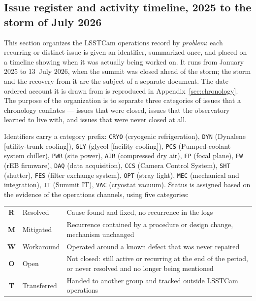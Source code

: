 \subsection{Issue register and activity timeline, 2025 to the storm of July 2026}
\label{sec:issues}

This section organizes the LSSTCam operations record by
\emph{problem}: each recurring or distinct issue is given an identifier,
summarized once, and placed on a timeline showing when it was actually being
worked on.  It runs from January 2025 to 13~July 2026, when the summit was
closed ahead of the storm; the storm and the recovery from it are the subject
of a separate document.  The date-ordered account it is drawn from is
reproduced in Appendix~\ref{sec:chronology}.  The purpose of the organization is to
separate three categories of issues that a chronology conflates --- issues that were closed,
issues that the observatory learned to live with, and issues that were never
closed at all.

Identifiers carry a category prefix: \texttt{CRYO} (cryogenic refrigeration), \texttt{DYN} (Dynalene [utility-trunk cooling]), \texttt{GLY} (glycol [facility cooling]), \texttt{PCS} (Pumped-coolant system chiller), \texttt{PWR} (site power), \texttt{AIR} (compressed dry air), \texttt{FP} (focal plane), \texttt{FW} (rEB firmware), \texttt{DAQ} (data acquisition), \texttt{CCS} (Camera Control System), \texttt{SHT} (shutter), \texttt{FES} (filter exchange system), \texttt{OPT} (stray light), \texttt{MEC} (mechanical and integration), \texttt{IT} (Summit IT), \texttt{VAC} (cryostat vacuum).
Status is assigned based on the evidence of the operations channels, using five
categories:

\begin{center}
\begin{tabular}{@{}clp{10.2cm}@{}}
\textcolor{stres}{\textbf{R}} & Resolved & Cause found and fixed, no recurrence in the logs \\
\textcolor{stmit}{\textbf{M}} & Mitigated & Recurrence contained by a procedure or design change, mechanism unchanged \\
\textcolor{stwrk}{\textbf{W}} & Workaround & Operated around a known defect that was never repaired \\
\textcolor{stopn}{\textbf{O}} & Open & Not closed: still active or recurring at the end of the period, or never resolved and no longer being mentioned \\
\textcolor{sttra}{\textbf{T}} & Transferred & Handed to another group and tracked outside LSSTCam operations \\
\end{tabular}
\end{center}

